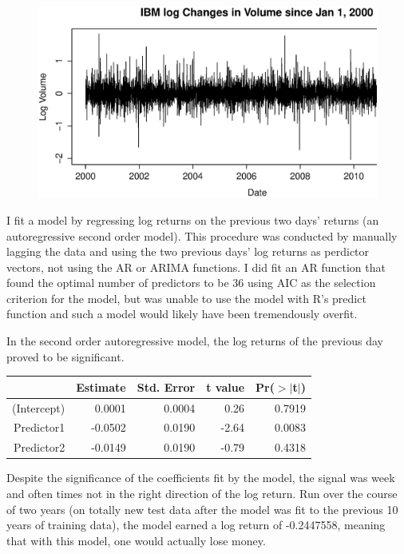 \documentclass{article}
\begin{document}
\begin{figure}[H]
\begin{center}
\includegraphics[width=1\columnwidth]{IBM_log_volume.eps}
\caption{}
\end{center}
\end{figure}


I fit a model by regressing log returns on the previous two days' returns (an autoregressive second order model).  This procedure was conducted by manually lagging the data and using the two previous days' log returns as perdictor vectors, not using the AR or ARIMA functions. I did fit an AR function that found the optimal number of predictors to be 36 using AIC as the selection criterion for the model, but was unable to use the model with R's predict function and such a model would likely have been tremendously overfit. 

In the second order autoregressive model, the log returns of the previous day proved to be significant.
\begin{table}[H]
\begin{center}
\begin{tabular}{rrrrr}
  \hline
 & Estimate & Std. Error & t value & Pr($>$$|$t$|$) \\ 
  \hline
(Intercept) & 0.0001 & 0.0004 & 0.26 & 0.7919 \\ 
  Predictor1 & -0.0502 & 0.0190 & -2.64 & 0.0083 \\ 
  Predictor2 & -0.0149 & 0.0190 & -0.79 & 0.4318 \\ 
   \hline
\end{tabular}
\end{center}
\end{table} 
Despite the significance of the coefficients fit by the model, the signal was week and often times not in the right direction of the log return.  Run over the course of two years (on totally new test data after the model was fit to the previous 10 years of training data), the model earned a log return of -0.2447558, meaning that with this model, one would actually lose money.
\end{document}
